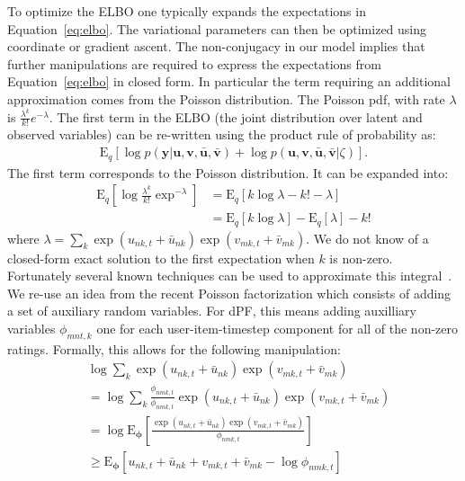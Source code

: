 \documentclass{sig-alternate}
\begin{document}
To optimize the ELBO one typically expands the expectations in
Equation~\ref{eq:elbo}. The variational parameters can then be optimized using coordinate or gradient ascent. The non-conjugacy in our model implies that further
manipulations are required to express the expectations from
Equation~\ref{eq:elbo} in closed form. In particular 
the term requiring an additional approximation comes from the
Poisson distribution. The Poisson pdf, with
rate $\lambda$ is $\frac{\lambda^k}{k!} e^{-\lambda}$. 
The first term in the ELBO (the joint distribution over latent and
observed variables) can be re-written using the product rule of probability as:
\begin{align*}
\text{E}_q[ \log p(\mathbf{y}|\mathbf{u},\mathbf{v},\mathbf{\bar{u}},\mathbf{\bar{v}}) + \log p(\mathbf{u},\mathbf{v},\mathbf{\bar{u}},\mathbf{\bar{v}} | \zeta ) ].
\end{align*}
The first term corresponds to the Poisson distribution. It can be expanded into: 
\begin{align*}
\text{E}_q[ \log \frac{\lambda^k}{k!}\exp^{-\lambda} ] 
&= \text{E}_q[ k\log\lambda - k! -\lambda ] \\ 
&= \text{E}_q[ k\log\lambda ] - \text{E}_q[ \lambda ] - k!
\end{align*}
where $\lambda = \sum_k \exp(u_{nk,t} + \bar{u}_{nk}) \exp(v_{mk,t} +
\bar{v}_{mk} )$. We do not know of a closed-form exact solution to the first
expectation when $k$ is non-zero.
Fortunately several known techniques can be used to approximate this
integral~\citep{Wang:2013}. We re-use an idea from the recent
Poisson factorization which consists of adding a set of auxiliary random
variables. For dPF, this means adding auxilliary variables
$\phi_{mnt,k}$ one for each user-item-timestep component for all of 
the non-zero ratings. Formally,
this allows for the following manipulation: 
\begin{align}
&\log \sum_k \exp(u_{nk,t} + \bar{u}_{nk}) \exp(v_{mk,t} + \bar{v}_{mk} )  \\ 
&= \log\sum_k \frac{\phi_{nmk,t}}{\phi_{nmk,t}} \exp(u_{nk,t} + \bar{u}_{nk}) \exp(v_{mk,t} + \bar{v}_{mk} ) \\ 
&= \log \text{E}_{\mathbf{\phi}} [ \frac{\exp(u_{nk,t} + \bar{u}_{nk})
\exp(v_{mk,t} + \bar{v}_{mk} )}{\phi_{nmk,t}} ] \\ 
&\geqslant \text{E}_{\mathbf{\phi}} [ u_{nk,t} + \bar{u}_{nk} +
v_{mk,t} + \bar{v}_{mk} - \log\phi_{nmk,t} ] \\ 
\label{eq:double-jensen}
\end{align}
\end{document}
